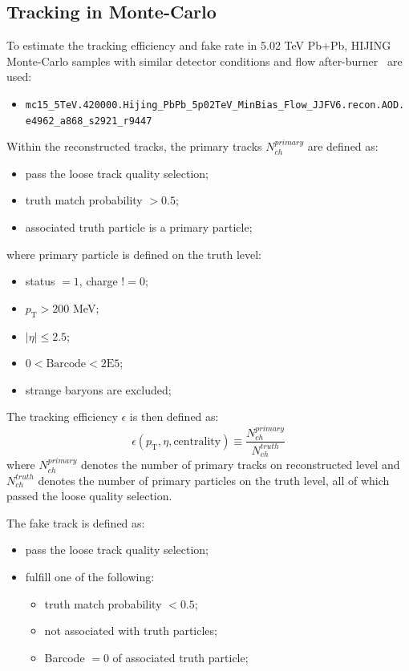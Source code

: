 \subsection{Tracking in Monte-Carlo}
To estimate the tracking efficiency and fake rate in 5.02 TeV Pb+Pb, HIJING Monte-Carlo samples with similar detector conditions and flow after-burner~\cite{Poskanzer:1998yz} are used:
\begin{itemize}
\item \verb|mc15_5TeV.420000.Hijing_PbPb_5p02TeV_MinBias_Flow_JJFV6.recon.AOD.| \\
\verb|e4962_a868_s2921_r9447|
\end{itemize}

Within the reconstructed tracks, the primary tracks $N_{ch}^{primary}$ are defined as:
\begin{itemize}
\item pass the loose track quality selection;
\item truth match probability $> 0.5$;
\item associated truth particle is a primary particle;
\end{itemize}
where primary particle is defined on the truth level:
\begin{itemize}
\item status $= 1$, charge $!= 0$;
\item $p_{\text{T}}>200$ MeV;
\item $|\eta|\leq 2.5$;
\item $0 < \text{Barcode} < 2\text{E}5$;
\item strange baryons are excluded;
\end{itemize}

The tracking efficiency $\epsilon$ is then defined as:
\begin{equation}
\epsilon(p_{\text{T}},\eta,\text{centrality})\equiv \frac{N_{ch}^{primary}}{N_{ch}^{truth}}
\end{equation}
where $N_{ch}^{primary}$ denotes the number of primary tracks on reconstructed level and $N_{ch}^{truth}$ denotes the number of primary particles on the truth level, all of which passed the loose quality selection.

The fake track is defined as:
\begin{itemize}
\item pass the loose track quality selection;
\item fulfill one of the following:
\begin{itemize}
\item truth match probability $< 0.5$;
\item not associated with truth particles;
\item Barcode $= 0$ of associated truth particle;
\end{itemize}
\end{itemize}


